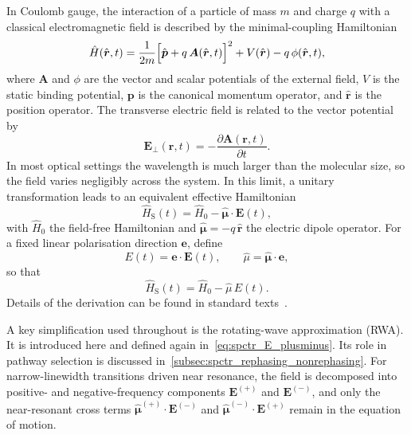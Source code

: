 In Coulomb gauge, the interaction of a particle of mass $m$ and charge $q$ with a classical electromagnetic field is described by the minimal-coupling Hamiltonian
\begin{equation*}
	\hat{H}(\hat{\boldsymbol{r}}, t)
	= \frac{1}{2m}\Bigl[\hat{\boldsymbol{p}} + q\,\boldsymbol{A}(\hat{\boldsymbol{r}},t)\Bigr]^2
	+ V(\hat{\boldsymbol{r}}) - q\,\phi(\hat{\boldsymbol{r}},t),
\end{equation*}
where $\boldsymbol{A}$ and $\phi$ are the vector and scalar potentials of the external field, $V$ is the static binding potential, $\boldsymbol{p}$ is the canonical momentum operator, and $\hat{\boldsymbol{r}}$ is the position operator.
The transverse electric field is related to the vector potential by
\begin{equation*}
	\boldsymbol{E}_\perp(\boldsymbol{r},t)=-\frac{\partial \boldsymbol{A}(\boldsymbol{r},t)}{\partial t}.
\end{equation*}
In most optical settings the wavelength is much larger than the molecular size, so the field varies negligibly across the system.
In this limit, a unitary transformation leads to an equivalent effective Hamiltonian
\begin{equation*}
	\hat{H}_{\mathrm{S}}(t)=\hat{H}_0 - \hat{\boldsymbol{\mu}}\cdot\boldsymbol{E}(t),
\end{equation*}
with $\hat{H}_0$ the field-free Hamiltonian and $\hat{\boldsymbol{\mu}}=-q\,\hat{\boldsymbol{r}}$ the electric dipole operator.
For a fixed linear polarisation direction $\boldsymbol{e}$, define
\begin{equation*}
	E(t)=\boldsymbol{e}\cdot\boldsymbol{E}(t),
	\qquad
	\hat{\mu}=\hat{\boldsymbol{\mu}}\cdot\boldsymbol{e},
\end{equation*}
so that
\begin{equation}
	\hat{H}_{\mathrm{S}}(t)=\hat{H}_0 - \hat{\mu}\,E(t).
\label{eq:spctr_semiclassical_hamiltonian_scalar}
\end{equation}
Details of the derivation can be found in standard texts~\cite{cohen-tannoudjietal2008atomphotoninteractionsbasic,berman2011principleslaserspectroscopy}.

A key simplification used throughout is the rotating-wave approximation (RWA).
It is introduced here and defined again in~\autoref{eq:spctr_E_plusminus}. Its role in pathway selection is discussed in~\autoref{subsec:spctr_rephasing_nonrephasing}.
For narrow-linewidth transitions driven near resonance, the field is decomposed into positive- and negative-frequency components $\boldsymbol{E}^{(+)}$ and $\boldsymbol{E}^{(-)}$, and only the near-resonant cross terms $\hat{\boldsymbol{\mu}}^{(+)}\!\cdot\!\boldsymbol{E}^{(-)}$ and $\hat{\boldsymbol{\mu}}^{(-)}\!\cdot\!\boldsymbol{E}^{(+)}$ remain in the equation of motion.

